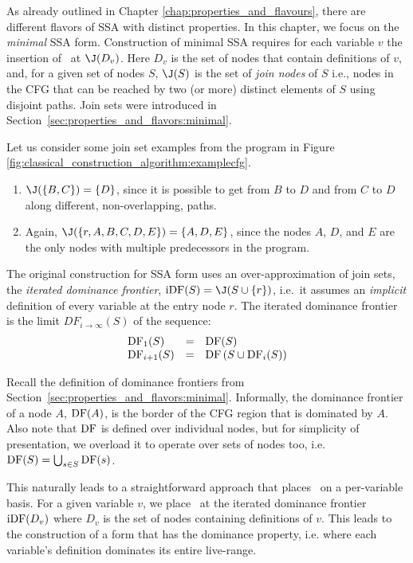 As already outlined in Chapter \ref{chap:properties_and_flavours},
there are different flavors of SSA with distinct properties.
In this chapter, we focus on the \textit{minimal} SSA form.
Construction of minimal SSA 
requires for each variable $v$ the insertion of \phiops\ at $\join(D_v)$.
Here $D_v$ is the set of nodes that contain definitions of $v$, and,
for a given set of nodes $S$, $\join(S)$ is the set of
\textit{join nodes} of $S$
i.e., nodes in the CFG that can be reached by
two (or more) distinct elements of $S$ using disjoint paths.
Join sets were introduced in Section~\ref{sec:properties_and_flavors:minimal}.

Let us consider some join set examples from the
program in Figure \ref{fig:classical_construction_algorithm:examplecfg}.
\begin{enumerate}
\item $\join(\{B,C\}) = \{D\}$, since it is possible to get from $B$ to $D$
and from $C$ to $D$ along different, non-overlapping, paths.
\item Again, $\join(\{r, A, B, C, D, E \}) = \{A,D,E\}$, since the nodes
$A$, $D$, and $E$ are the only nodes with multiple predecessors in
the program.
\end{enumerate}

 
The original construction for SSA form uses an over-approximation of
join sets, the
\emph{iterated dominance frontier}, $\iDF(S)=\join(S\cup
\{r\})$, i.e.\ it assumes an \emph{implicit} definition of every
variable at the entry node $r$.
The iterated dominance frontier is the limit $DF_{i\rightarrow\infty}(S)$
of the sequence:
$$\begin{array}{lll}
\mathrm{DF}_1(S) & = & \mathrm{DF}(S)\\
\mathrm{DF}_{i+1}(S) & = & \mathrm{DF}\left(S\cup \mathrm{DF}_i(S)\right)
\end{array}$$

Recall the definition of dominance frontiers from Section~\ref{sec:properties_and_flavors:minimal}.
Informally, the dominance frontier of a node $A$, $\mathrm{DF}(A)$,
is the border of the CFG region that is dominated by $A$.
Also note that $\mathrm{DF}$ is defined over individual nodes, 
but for simplicity of presentation, we overload it to 
operate over sets of nodes too, i.e.\ 
$\mathrm{DF}(S) = \bigcup_{s\in S} \mathrm{DF}(s)$.

This naturally leads to a
straightforward approach that places \phiops\
on a per-variable basis.
For a given variable $v$, we place \phiops\ at the
iterated dominance frontier $\mathrm{iDF}(D_v)$ where
$D_v$ is the set of nodes containing definitions of $v$.
This leads to the construction of a form that has 
the dominance property, i.e. where each variable's definition dominates its entire live-range.

